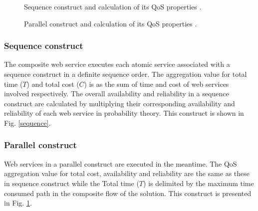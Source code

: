 \documentclass{llncs}
\begin{document}
\begin{figure}[h]
\centerline{
}
\caption{Sequence construct and calculation of its QoS properties
\cite{yu2013adaptive}.}
\label{sequence}
\vspace{0.3cm}
\centerline{
}
\caption{Parallel construct and calculation of its QoS properties
\cite{yu2013adaptive}.}
\label{parallel}
\end{figure}

\subsubsection{Sequence construct}
The composite web service executes each atomic service associated with a sequence construct in a definite sequence order. The aggregation value for total time ($T$) and total cost ($C$) is as the sum of time and cost of web services involved respectively. The overall availability and reliability in a sequence construct are calculated by multiplying their corresponding availability and reliability of each web service in probability theory. This construct is shown in Fig. \ref{sequence}.
\subsubsection{Parallel construct}
Web services in a parallel construct are executed in the meantime. The QoS aggregation value for total cost, availability and reliability are the same as these in sequence construct while the Total time ($T$) is delimited by the maximum time consumed path in the composite flow of the solution. This construct is presented in Fig. \ref{parallel}.
\end{document}
